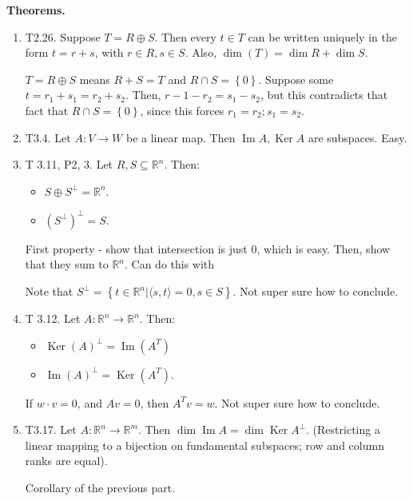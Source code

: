 \documentclass{article}
\newcommand{\RR}{\mathbb{R}}
\newcommand{\la}{\langle}
\newcommand{\ra}{\rangle}
\DeclareMathOperator{\Ker}{Ker}
\DeclareMathOperator{\Ima}{Im}
\DeclareMathOperator{\Ima}{Im}
\begin{document}
{\bf Theorems.}

\begin{enumerate}
    \item T2.26. Suppose $T = R \oplus S$.  Then every $t \in T$ can be written uniquely in the form $t = r+s$, with $r \in R, s \in S$.  Also, $\dim (T) = \dim R + \dim S$.

      $T = R \oplus S$ means $R + S = T$ and $R \cap S = \left\{ 0 \right\}$.  Suppose some $t = r_1 + s_1 = r_2 + s_2$.  Then, $r-1 - r_2 = s_1 - s_2$, but this contradicts that fact that $R \cap S = \left\{ 0 \right\}$, since this forces $r_1 = r_2; s_1 = s_2$.

    \item T3.4. Let $A: V \to W$ be a linear map.  Then $\Ima A, \Ker A$ are subspaces.  Easy.

    \item  T 3.11, P2, 3. Let $R, S \subseteq \RR^n$.  Then:

      \begin{itemize}
        \item $S \oplus S^{\perp} = \RR^n$.
        \item $(S^{\perp})^{\perp} = S$.
      \end{itemize}

      First property - show that intersection is just $0$, which is easy.  Then, show that they sum to $\RR^n$.  Can do this with

      Note that $S^{\perp} = \left\{ t \in \RR^n | \la s, t \ra = 0, s \in S \right\}$.  Not super sure how to conclude.

    \item T 3.12. Let $A: \RR^n \to \RR^n$.  Then:

      \begin{itemize}
        \item $\Ker(A)^{\perp} = \Ima (A^T)$
        \item $\Ima (A)^{\perp} = \Ker (A^T)$.
      \end{itemize}

      If $w \cdot v = 0$, and $Av = 0$, then $A^T v = w$.  Not super sure how to conclude.

    \item T3.17. Let $A: \RR^n \to \RR^m$. Then $\dim \Ima A = \dim \Ker A^{\perp}$. (Restricting a linear mapping to a bijection on fundamental subspaces; row and column ranks are equal).

      Corollary of the previous part.


\end{enumerate}
\end{document}
